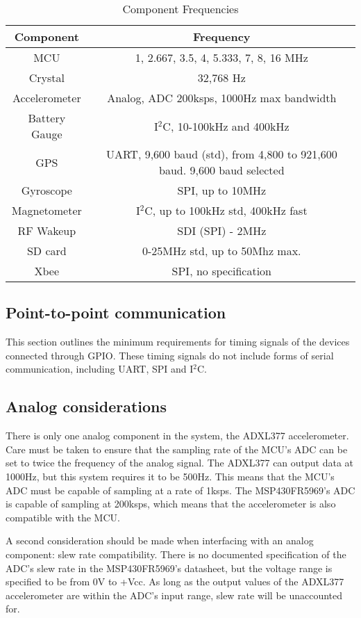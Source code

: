 \begin{table}[H]
  \centering
  \caption{Component Frequencies}
    \begin{tabular}{|c|c|}
    \hline
    Component & Frequency \\
    \hline \hline
    MCU   & 1, 2.667, 3.5, 4, 5.333, 7, 8, 16 MHz \\ \hline
    Crystal & 32,768 Hz \\ \hline
    Accelerometer & Analog, ADC 200ksps, 1000Hz max bandwidth \\ \hline
    Battery Gauge & I$^2$C, 10-100kHz and 400kHz \\ \hline
    GPS   & UART, 9,600 baud (std), from 4,800 to 921,600 baud. 9,600 baud selected\\ \hline
    Gyroscope & SPI, up to 10MHz \\ \hline
    Magnetometer & I$^2$C, up to 100kHz std, 400kHz fast \\ \hline
    RF Wakeup & SDI (SPI) - 2MHz \\ \hline
    SD card & 0-25MHz std, up to 50Mhz max. \\ \hline
    Xbee  & SPI, no specification \\ \hline
    \end{tabular}
  \label{tab:compFreq}
\end{table}

\subsection{Point-to-point communication}
This section outlines the minimum requirements for timing signals of the devices connected through GPIO. These timing signals do not include forms of serial communication, including UART, SPI and I$^2$C.



\subsection{Analog considerations}
There is only one analog component in the system, the ADXL377 accelerometer. Care must be taken to ensure that the sampling rate of the MCU's ADC can be set to twice the frequency of the analog signal. The ADXL377 can output data at 1000Hz, but this system requires it to be 500Hz. This means that the MCU's ADC must be capable of sampling at a rate of 1ksps. The MSP430FR5969's ADC is capable of sampling at 200ksps, which means that the accelerometer is also compatible with the MCU.

A second consideration should be made when interfacing with an analog component: slew rate compatibility. There is no documented specification of the ADC's slew rate in the MSP430FR5969's datasheet, but the voltage range is specified to be from 0V to +Vcc. As long as the output values of the ADXL377 accelerometer are within the ADC's input range, slew rate will be unaccounted for.




